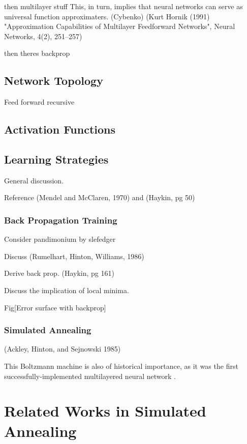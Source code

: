 \documentclass[11pt]{afthesis}
\begin{document}
	then multilayer stuff
	This, in turn, implies that neural networks can serve as universal function approximaters. (Cybenko)
	(Kurt Hornik (1991) "Approximation Capabilities of Multilayer Feedforward Networks", Neural Networks, 4(2), 251–257)
	
	then theres backprop
	
	
	
	
	
	\subsection{Network Topology}
	
	Feed forward
	recursive
	
	\subsection{Activation Functions}
	
	\subsection{Learning Strategies}
	
	General discussion.
	
	Reference (Mendel and McClaren, 1970) and (Haykin, pg 50)
	
	\subsubsection{Back Propagation Training}
	
	Consider pandimonium by slefedger
	
	Discuss (Rumelhart, Hinton, Williams, 1986)
	
	Derive back prop. (Haykin, pg 161)
	
	Discuss the implication of local minima.
	
	Fig[Error surface with backprop]
	
	
	\subsubsection{Simulated Annealing}
	
	(Ackley, Hinton, and Sejnowski 1985) 
	
	This Boltzmann machine is also of historical importance, as it was the first successfully-implemented multilayered neural network \cite{haykin1999}.
	
	
	\section{Related Works in Simulated Annealing}
	
\end{document}
